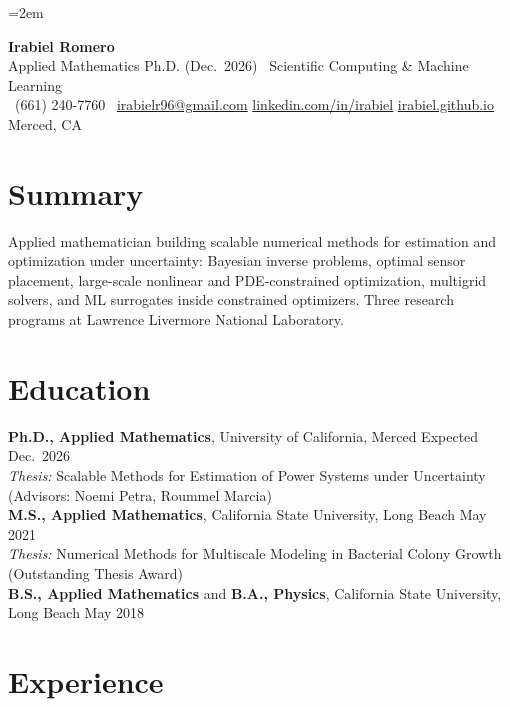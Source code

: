 \documentclass[10pt]{article}
\begin{document}
\emergencystretch=2em

\begin{center}
  {\bfseries \LARGE Irabiel Romero} \\[0.06in]
  Applied Mathematics Ph.D. (Dec.\ 2026) \textbar\ Scientific Computing \& Machine Learning \\[0.04in]
  \Mobilefone\ (661) 240-7760 \quad
  \Letter\ \href{mailto:irabielr96@gmail.com}{irabielr96@gmail.com} \quad
  \href{https://www.linkedin.com/in/irabiel}{linkedin.com/in/irabiel} \quad
  \href{https://irabiel.github.io}{irabiel.github.io} \quad
  Merced, CA
\end{center}

\section*{Summary}
\noindent
Applied mathematician building scalable numerical methods for estimation and
optimization under uncertainty: Bayesian inverse problems, optimal sensor
placement, large-scale nonlinear and PDE-constrained optimization, multigrid
solvers, and ML surrogates inside constrained optimizers. Three research
programs at Lawrence Livermore National Laboratory.

\section*{Education}
\noindent
{\bf Ph.D., Applied Mathematics}, University of California, Merced \hfill Expected Dec.\ 2026\\
{\it Thesis:} Scalable Methods for Estimation of Power Systems under Uncertainty
(Advisors: Noemi Petra, Roummel Marcia)\\[2pt]
{\bf M.S., Applied Mathematics}, California State University, Long Beach \hfill May 2021\\
{\it Thesis:} Numerical Methods for Multiscale Modeling in Bacterial Colony Growth
(Outstanding Thesis Award)\\[2pt]
{\bf B.S., Applied Mathematics} and {\bf B.A., Physics}, California State
University, Long Beach \hfill May 2018

\section*{Experience}
\end{document}
